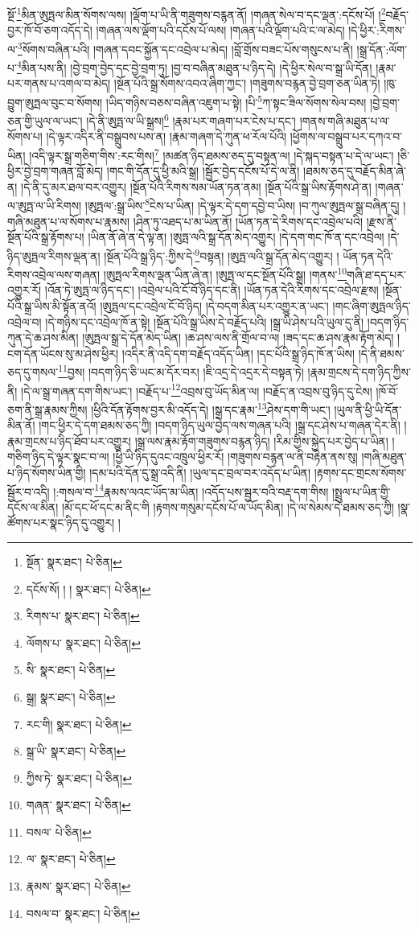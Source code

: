 སྔོ་\footnote{སྔོན་  སྣར་ཐང་།  པེ་ཅིན། }མིན་ཨུཏྤལ་མིན་སོགས་ལས། །ལྡོག་པ་ཡི་ནི་གཟུགས་བརྙན་ནོ། །གཞན་སེལ་བ་དང་ལྡན་:དངོས་པོ། །\footnote{དངོས་སོ། ། །  སྣར་ཐང་།  པེ་ཅིན། }བརྗོད་བྱར་ཁོ་བོ་ཅག་འདོད་དེ། །གཞན་ལས་ལྡོག་པའི་དངོས་པོ་ལས། །གཞན་པའི་ལྡོག་པའི་ང་ལ་མེད། །དེ་ཕྱིར་:རིགས་ལ་\footnote{རིགས་པ་  སྣར་ཐང་།  པེ་ཅིན། }སོགས་བཞིན་པའི། །གཞན་དབང་སྐྱོན་དང་འབྲེལ་པ་མེད། །བློ་གྲོས་བཟང་པོས་གསུངས་པ་ནི། །སྒྲ་དོན་:ལོག་པ་\footnote{ལོགས་པ་  སྣར་ཐང་།  པེ་ཅིན། }མིན་པས་ནི། །བྱེ་བྲག་བྱེད་དང་བྱེ་བྲག་ཏུ། །བྱ་བ་བཞིན་མཐུན་པ་ཉིད་དེ། །དེ་ཕྱིར་སེལ་བ་སྒྲ་ཡི་དོན། །རྣམ་པར་གནས་པ་འགལ་བ་མེད། །སྔོན་པོའི་སྒྲ་སོགས་འབའ་ཞིག་ཀྱང་། །གཟུགས་བརྙན་བྱེ་བྲག་ཅན་ཡིན་ཏེ། །ཁུ་བྱུག་ཨུཏྤལ་བུང་བ་སོགས། །ཡིད་གཉིས་བཅས་བཞིན་འཇུག་པ་སྟེ། །པི་\footnote{སི་  སྣར་ཐང་།  པེ་ཅིན། }ཀ་སྟང་ཟིལ་སོགས་སེལ་བས། །བྱེ་བྲག་ཅན་གྱི་ཡུལ་ལ་ཡང་། །དེ་ནི་ཨུཏྤ་ལ་ཡི་སྒྲས།\footnote{སྒྲ།  སྣར་ཐང་།  པེ་ཅིན། } །རྣམ་པར་གཞག་པར་ངེས་པ་དང་། །གནས་གཞི་མཐུན་པ་ལ་སོགས་པ། །དེ་ལྟར་འདིར་ནི་བསྒྲུབས་པས་ན། །རྣམ་གཞག་དེ་ཀུན་ཕ་རོལ་པོའི། །ཕྱོགས་ལ་བསྒྲུབ་པར་དཀའ་བ་ཡིན། །འདི་ལྟར་སྒྲ་གཅིག་གིས་:རང་གིས།\footnote{རང་གི།  སྣར་ཐང་།  པེ་ཅིན། } །མཚན་ཉིད་ཐམས་ཅད་དུ་བསྟན་ལ། །དེ་སྐད་བསྟན་པ་དེ་ལ་ཡང་། །ཅི་ཕྱིར་བྱེ་བྲག་གཞན་བློ་མེད། །གང་གི་དོན་དུ་ཕྱི་མའི་སྒྲ། །སྦྱོར་བྱེད་དངོས་པོ་དེ་ལ་ནི། །ཐམས་ཅད་དུ་བརྗོད་མིན་ཞེ་ན། །དེ་ནི་དུ་མར་ཐལ་བར་འགྱུར། །སྔོན་པོའི་རིགས་སམ་ཡོན་ཏན་ནམ། །སྔོན་པོའི་སྒྲ་ཡིས་རྟོགས་ཤེ་ན། །གཞན་ལ་ཨུཏྤ་ལ་ཡི་རིགས། །ཨུཏྤལ་:སྒྲ་ཡིས་\footnote{སྒྲ་ཡི་  སྣར་ཐང་།  པེ་ཅིན། }ངེས་པ་ཡིན། །དེ་ལྟར་དེ་དག་དབྱེ་བ་ཡིས། །བ་ཀུལ་ཨུཏྤལ་སྒྲ་བཞིན་དུ། །གཞི་མཐུན་པ་ལ་སོགས་པ་རྣམས། །ཤིན་ཏུ་འཐད་པ་མ་ཡིན་ནོ། །ཡོན་ཏན་དེ་རིགས་དང་འབྲེལ་པའི། །རྫས་ནི་སྔོན་པོའི་སྒྲ་རྟོགས་པ། །ཡིན་ནོ་ཞེ་ན་དེ་ལྟ་ན། །ཨུཏྤ་ལའི་སྒྲ་དོན་མེད་འགྱུར། །དེ་དག་གང་ཁོ་ན་དང་འབྲེལ། །དེ་ཉིད་ཨུཏྤལ་རིགས་ལྡན་ན། །སྔོན་པོའི་སྒྲ་ཉིད་:ཀྱིས་དེ་\footnote{ཀྱིས་ཏེ་  སྣར་ཐང་།  པེ་ཅིན། }བསྟན། །ཨུཏྤ་ལའི་སྒྲ་དོན་མེད་འགྱུར། །
ཡོན་ཏན་དེའི་རིགས་འབྲེལ་ལས་གཞན། །ཨུཏྤལ་རིགས་ལྡན་ཡིན་ཞེ་ན། །ཨུཏྤ་ལ་དང་སྔོན་པོའི་སྒྲ། །གནས་\footnote{གཞན་  སྣར་ཐང་།  པེ་ཅིན། }གཞི་ཐ་དད་པར་འགྱུར་རོ། །འོན་ཏེ་ཨུཏྤ་ལ་ཉིད་དང་། །འབྲེལ་པའི་ངོ་བོ་ཉིད་དང་ནི། །ཡོན་ཏན་དེའི་རིགས་དང་འབྲེལ་རྫས། །སྔོན་པོའི་སྒྲ་ཡིས་མི་སྟོན་ནའོ། །ཨུཏྤལ་དང་འབྲེལ་ངོ་བོ་ཉིད། །དེ་བདག་མིན་པར་འགྱུར་ན་ཡང་། །གང་ཞིག་ཨུཏྤལ་ཉིད་འབྲེལ་བ། །དེ་གཉིས་དང་འབྲེལ་ཁོ་ན་སྟེ། །སྔོན་པོའི་སྒྲ་ཡིས་དེ་བརྗོད་པའི། །སྒྲ་ཡི་ཤེས་པའི་ཡུལ་དུ་ནི། །བདག་ཉིད་ཀུན་དེ་ཆ་ཤས་མིན། །ཨུཏྤལ་སྒྲ་དེ་དོན་མེད་ཡིན། །ཆ་ཤས་ལས་ནི་གྲོལ་བ་ལ། །ཟད་དང་ཆ་ཤས་རྣམ་རྟོག་མེད། །ངག་དོན་ཡོངས་སུ་མ་ཤེས་ཕྱིར། །འདིར་ནི་འདི་དག་བརྗོད་འདོད་ཡིན། །དང་པོའི་སྒྲ་ཉིད་ཁོ་ན་ཡིས། །དེ་ནི་ཐམས་ཅད་དུ་གསལ་\footnote{བསལ་  པེ་ཅིན། }བྱས། །བདག་ཉིད་ཅི་ཡང་མ་དོར་བར། །ཇི་འདྲ་དེ་འདྲར་དེ་བསྟན་ཏེ། །རྣམ་གྲངས་དེ་དག་ཉིད་ཀྱིས་ནི། །དེ་ལ་སྒྲ་གཞན་དག་གིས་ཡང་། །བརྗོད་པ་\footnote{ལ་  སྣར་ཐང་།  པེ་ཅིན། }འབྲས་བུ་ཡོད་མིན་ལ། །བརྗོད་ན་འབྲས་བུ་ཉིད་དུ་ངེས། །ཁོ་བོ་ཅག་ནི་སྒྲ་རྣམས་ཀྱིས། །ཕྱིའི་དོན་རྟོགས་བྱར་མི་འདོད་དེ། །སྒྲ་དང་རྣམ་\footnote{རྣམས་  སྣར་ཐང་།  པེ་ཅིན། }ཤེས་དག་གི་ཡང་། །ཡུལ་ནི་ཕྱི་ཡི་དོན་མིན་ནོ། །གང་ཕྱིར་དེ་དག་ཐམས་ཅད་ཀྱི། །བདག་ཉིད་ཡུལ་བྱེད་ལས་གཞན་པའི། །སྒྲ་དང་ཤེས་པ་གཞན་དེར་ནི། །རྣམ་གྲངས་པ་ཉིད་ཐོབ་པར་འགྱུར། །སྒྲ་ལས་རྣམ་རྟོག་གཟུགས་བརྙན་ཉིད། །རིམ་གྱིས་སྐྱེད་པར་བྱེད་པ་ཡིན། །གཅིག་ཉིད་དེ་ལྟར་སྣང་བ་ལ། །ཕྱི་ཡི་ཉིད་དུའང་འཁྲུལ་ཕྱིར་རོ། །གཟུགས་བརྙན་ལ་ནི་བརྟེན་ནས་སུ། །གཞི་མཐུན་པ་ཉིད་སོགས་ཡིན་གྱི། །དམ་པའི་དོན་དུ་སྒྲ་འདི་ནི། །ཡུལ་དང་བྲལ་བར་འདོད་པ་ཡིན། །རྟགས་དང་གྲངས་སོགས་སྦྱོར་བ་འདི། །:གསལ་བ་\footnote{བསལ་བ་  སྣར་ཐང་།  པེ་ཅིན། }རྣམས་ལའང་ཡོད་མ་ཡིན། །འདོད་པས་སྦྱར་བའི་བརྡ་དག་གིས། །སྤྲུལ་པ་ཡིན་གྱི་དངོས་ལ་མིན། །མོ་དང་ཕོ་དང་མ་ནིང་གི །རྟགས་གསུམ་དངོས་པོ་ལ་ཡོད་མིན། །དེ་ལ་སེམས་དེ་ཐམས་ཅད་ཀྱི། །སྣ་ཚོགས་པར་སྣང་ཉིད་དུ་འགྱུར། །
